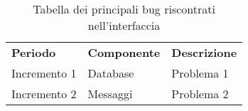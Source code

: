 \begin{table} [!ht]
	\begin{center}
		\begin{tabular} { m{3cm} m{3cm} m{6cm}  }
			\rowcolor{lightgray}
			\textbf{Periodo} & \textbf{Componente} & \textbf{Descrizione}\\
			
			Incremento 1 & Database & Problema 1 \\
			Incremento 2 & Messaggi & Problema 2 \\
			
		\end{tabular}
	\end{center}
	\caption{Tabella dei principali bug riscontrati nell'interfaccia}
\end{table}